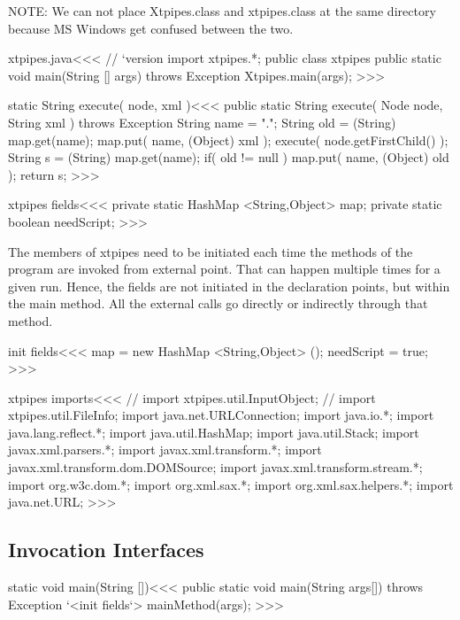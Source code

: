 \documentclass{article}
\begin{document}
{

NOTE: We can not place Xtpipes.class and xtpipes.class at the same
directory because MS Windows get confused between the two.


\<xtpipes.java\><<<
// `version
import xtpipes.*;
public class xtpipes {
  public static void main(String [] args) throws Exception {
    Xtpipes.main(args);
} }
>>>


\<static String execute( node, xml )\><<<
public static String execute( Node node, String xml )
                                      throws Exception {
  String name = ".";
  String old = (String) map.get(name);
  map.put( name, (Object) xml );
  execute( node.getFirstChild() );
  String s = (String) map.get(name);
  if( old != null ){ map.put( name, (Object) old ); }
  return s;
}
>>>







\<xtpipes fields\><<<
private static HashMap <String,Object> map;
private static boolean needScript;
>>>


The members of xtpipes need to be initiated each time the methods of
the program are invoked from external point.  That can happen multiple
times for a given run. Hence, the fields are not initiated in the
declaration points, but within the main method.  All the external
calls go directly or indirectly through that method.


\<init fields\><<<
map = new HashMap  <String,Object> ();
needScript = true;
>>>


\<xtpipes imports\><<<
// import xtpipes.util.InputObject;
// import xtpipes.util.FileInfo;
import java.net.URLConnection;
import java.io.*;
import java.lang.reflect.*;
import java.util.HashMap;
import java.util.Stack; 
import javax.xml.parsers.*;
import javax.xml.transform.*;
import javax.xml.transform.dom.DOMSource;
import javax.xml.transform.stream.*;
import org.w3c.dom.*;
import org.xml.sax.*;
import org.xml.sax.helpers.*;
import java.net.URL;
>>>

\subsection{Invocation Interfaces}

\<static void main(String [])\><<<
public static void main(String args[]) throws Exception {
  `<init fields`>
  mainMethod(args);
}
>>>




}
\end{document}
